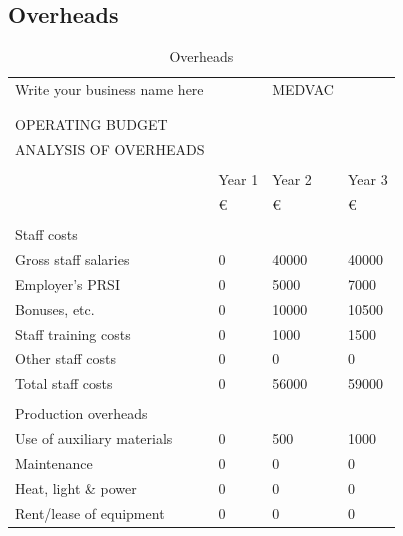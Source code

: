 \documentclass{article}
\begin{document}
\subsection{Overheads}
\begin{table}[H]
\centering
\caption{Overheads}
\label{my-label}
\begin{tabular}{llll}
Write your business name here     &        & MEDVAC &        \\
                                  &        &        &        \\
                                  &        &        &        \\
OPERATING BUDGET                  &        &        &        \\
ANALYSIS OF OVERHEADS             &        &        &        \\
                                  &        &        &        \\
                                  & Year 1 & Year 2 & Year 3 \\
                                  & €      & €      & €      \\
                                  &        &        &        \\
Staff costs                       &        &        &        \\
Gross staff salaries              & 0      & 40000 & 40000 \\
Employer’s PRSI                   & 0      & 5000   & 7000   \\
Bonuses, etc.                     & 0      & 10000  & 10500  \\
Staff training costs              & 0      & 1000   & 1500   \\
Other staff costs                 & 0      & 0      & 0      \\
Total staff costs                 & 0      & 56000 & 59000 \\
                                  &        &        &        \\
Production overheads              &        &        &        \\
Use of auxiliary materials        & 0      & 500    & 1000   \\
Maintenance                       & 0      & 0      & 0      \\
Heat, light \& power              & 0      & 0      & 0      \\
Rent/lease of equipment           & 0      & 0      & 0      \\

\end{tabular}
\end{table}
\end{document}

